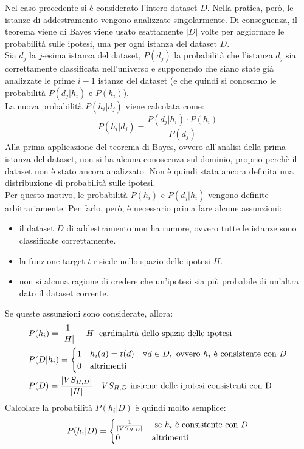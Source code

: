 Nel caso precedente si è considerato l'intero dataset $D$. Nella pratica, però,
le istanze di addestramento vengono analizzate singolarmente.
Di conseguenza, il teorema viene di Bayes viene usato esattamente $|D|$ volte
per aggiornare le probabilità sulle ipotesi, una per ogni istanza del dataset
$D$.\\
Sia $d_j$ la $j$-esima istanza del dataset, $P(d_j)$ la probabilità che
l'istanza $d_j$ sia correttamente classificata nell'universo e supponendo che
siano state già analizzate le prime $i-1$ istanze del dataset (e che quindi si
conoscano le probabilità $P(d_j | h_i)$ e $P(h_i)$).\\
La nuova probabilità $P(h_i | d_j)$ viene calcolata come:
\[
    P(h_i | d_j) = \frac{P(d_j | h_i) \cdot P(h_i)}{P(d_j)}
\]
Alla prima applicazione del teorema di Bayes, ovvero all'analisi della prima
istanza del dataset, non si ha alcuna conoscenza sul dominio, proprio perchè
il dataset non è stato ancora analizzato. Non è quindi stata ancora definita una
distribuzione di probabilità sulle ipotesi.\\
Per questo motivo, le probabilità $P(h_i)$ e $P(d_j | h_i)$ vengono definite
arbitrariamente. Per farlo, però, è necessario prima fare alcune assunzioni:
\begin{itemize}
    \item il dataset $D$ di addestramento non ha rumore, ovvero tutte le istanze
    sono classificate correttamente.
    \item la funzione target $t$ risiede nello spazio delle ipotesi $H$.
    \item non si alcuna ragione di credere che un'ipotesi sia più probabile di
    un'altra dato il dataset corrente.
\end{itemize}
Se queste assunzioni sono considerate, allora: 
\begin{align*}
    &P(h_i) = \frac{1}{|H|} \quad |H| \textnormal{ cardinalità dello spazio delle ipotesi}\\
    &P(D | h_i) = \begin{cases}
        1 & h_i(d) = t(d) \quad \forall d \in D, \textnormal{ ovvero $h_i$ è consistente con $D$}\\
        0 & \textnormal{altrimenti}
    \end{cases}\\
    &P(D) = \frac{|VS_{H,D}|}{|H|} \quad VS_{H,D} \textnormal{ insieme delle ipotesi consistenti con D}
\end{align*}
Calcolare la probabilità $P(h_i | D)$ è quindi molto semplice:
\begin{align*}
    P(h_i | D) = \begin{cases}
        \frac{1}{|VS_{H,D}|} & \textnormal{ se $h_i$ è consistente con $D$}\\
        0 & \textnormal{altrimenti}
    \end{cases}
\end{align*}

